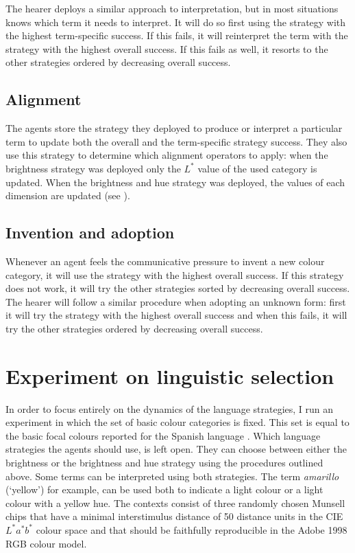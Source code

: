 The hearer deploys a similar approach to interpretation, but in most
situations knows which term it needs to interpret. It will do so first
using the strategy with the highest term-specific success. If this
fails, it will reinterpret the term with the strategy with the
highest overall success. If this fails as well, it resorts to the
other strategies ordered by decreasing overall success.

\subsection*{Alignment}

The agents store the strategy they deployed to produce or interpret a
particular term to update both the overall and the term-specific
strategy success. They also use this strategy to determine which
alignment operators to apply: when the brightness strategy was
deployed only the $L^*$ value of the used category is updated. When
the brightness and hue strategy was deployed, the values of each
dimension are updated (see ).

\subsection*{Invention and adoption}

Whenever an agent feels the communicative pressure to invent a new
colour category, it will use the strategy with the highest overall
success. If this strategy does not work, it will try the other
strategies sorted by decreasing overall success. The hearer will
follow a similar procedure when adopting an unknown form: first it
will try the strategy with the highest overall success and when this
fails, it will try the other strategies ordered by decreasing overall
success.

\section{Experiment on linguistic selection}

In order to focus entirely on the dynamics of the language strategies,
I run an experiment in which the set of basic colour categories is
fixed. This set is equal to the basic focal colours reported for the
Spanish language \citep{lillo07locating}. Which language strategies
the agents should use, is left open. They can choose between either
the brightness or the brightness and hue strategy using
the procedures outlined above. Some terms can be interpreted using
both strategies. The term \textit{amarillo} (`yellow') for example, can be
used both to indicate a light colour or a light colour with a yellow
hue. The contexts consist of three randomly chosen Munsell chips
that have a minimal interstimulus distance of 50 distance units in the CIE
$L^*a^*b^*$ colour space and that should be faithfully reproducible in the
Adobe 1998 RGB colour model.


